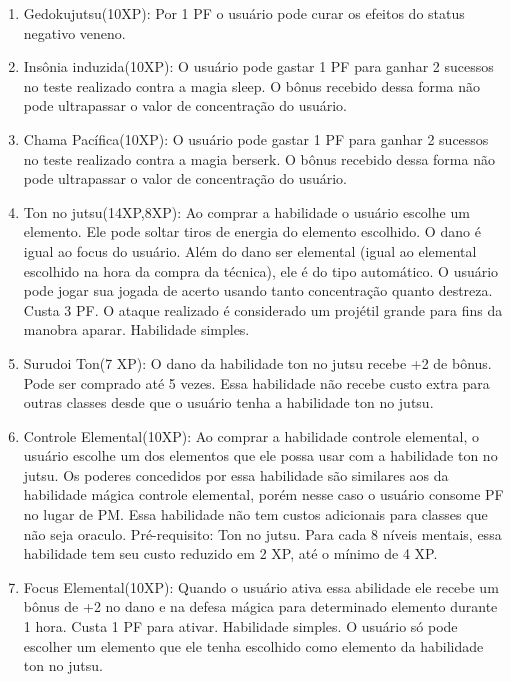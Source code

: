 \begin{enumerate}

	\item Gedokujutsu(10XP): Por 1 PF o usuário pode curar os efeitos do status negativo veneno.

	\item Insônia induzida(10XP): O usuário pode gastar 1 PF para ganhar 2 sucessos no teste realizado contra a magia sleep. O bônus recebido dessa forma não pode ultrapassar o valor de concentração do usuário.

	\item Chama Pacífica(10XP): O usuário pode gastar 1 PF para ganhar 2 sucessos no teste realizado contra a magia berserk. O bônus recebido dessa forma não pode ultrapassar o valor de concentração do usuário.

	\item Ton no jutsu(14XP,8XP): Ao comprar a habilidade o usuário escolhe um elemento. Ele pode soltar tiros de energia do elemento escolhido. O dano é igual ao focus do usuário. Além do dano ser elemental (igual ao elemental escolhido na hora da compra da técnica), ele é do tipo automático. O usuário pode jogar sua jogada de acerto usando tanto concentração quanto destreza. Custa 3 PF. O ataque realizado é considerado um projétil grande para fins da manobra aparar. Habilidade simples. 

	\item Surudoi Ton(7 XP):  O dano da habilidade ton no jutsu recebe +2 de bônus. Pode ser comprado até 5 vezes. Essa habilidade não recebe custo extra para outras classes desde que o usuário tenha a habilidade ton no jutsu.

 	\item Controle Elemental(10XP): Ao comprar a habilidade controle elemental, o usuário escolhe um dos elementos que ele possa usar com a habilidade ton no jutsu. Os poderes concedidos por essa habilidade são similares aos da habilidade mágica controle elemental, porém nesse caso o usuário consome PF no lugar de PM. Essa habilidade não tem custos adicionais para classes que não seja oraculo. Pré-requisito: Ton no jutsu. Para cada 8 níveis mentais, essa habilidade tem seu custo reduzido em 2 XP, até o mínimo de 4 XP.

 	\item Focus Elemental(10XP): Quando o usuário ativa essa abilidade ele recebe um bônus de +2 no dano e na defesa mágica para determinado elemento durante 1 hora. Custa 1 PF para ativar. Habilidade simples. O usuário só pode escolher um elemento que ele tenha escolhido como elemento da habilidade ton no jutsu.
 	

\end{enumerate}
